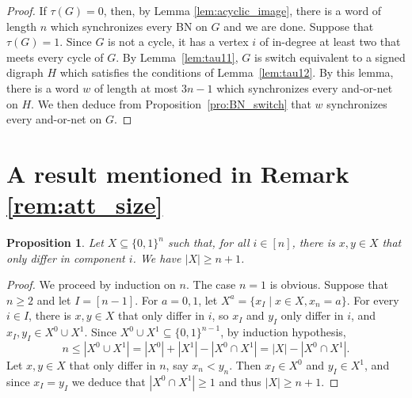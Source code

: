 \documentclass[11pt,letter]{article}
\newtheorem{proposition}{Proposition}
\newcommand{\B}{\{0,1\}}
\begin{document}
\begin{proof}
If $\tau(G)=0$, then, by Lemma \ref{lem:acyclic_image}, there is a word of length $n$ which synchronizes every BN on $G$ and we are done. Suppose that $\tau(G)=1$. Since $G$ is not a cycle, it has a vertex $i$ of in-degree at least two that meets every cycle of $G$. By Lemma~\ref{lem:tau11}, $G$ is switch equivalent to a signed digraph $H$ which satisfies the conditions of Lemma~\ref{lem:tau12}. By this lemma, there is a word $w$ of length at most $3n-1$ which synchronizes every and-or-net on $H$. We then deduce from Proposition~\ref{pro:BN_switch} that $w$ synchronizes every and-or-net on $G$.   
\end{proof}

\section{A result mentioned in Remark \ref{rem:att_size}}\label{app:att_size}

\begin{proposition}
Let $X\subseteq \B^n$ such that, for all $i\in [n]$, there is $x,y\in X$ that only differ in component $i$. We have $|X|\geq n+1$.
\end{proposition}

\begin{proof}
We proceed by induction on $n$. The case $n=1$ is obvious. Suppose that $n\geq 2$ and let $I=[n-1]$. For $a=0,1$, let $X^a=\{x_I\mid x\in X, x_n=a\}$. For every $i\in I$, there is $x,y\in X$ that only differ in $i$, so $x_I$ and $y_I$ only differ in $i$, and $x_I,y_I\in X^0\cup X^1$. Since $X^0\cup X^1\subseteq \B^{n-1}$, by induction hypothesis, 
\[
n\leq |X^0\cup X^1|=|X^0|+|X^1|-|X^0\cap X^1|=|X|-|X^0\cap X^1|.
\]
Let $x,y\in X$ that only differ in $n$, say $x_n<y_n$. Then $x_I\in X^0$ and $y_I\in X^1$, and since $x_I=y_I$ we deduce that $|X^0\cap X^1|\geq 1$ and thus $|X|\geq n+1$. 
\end{proof}



\end{document}
